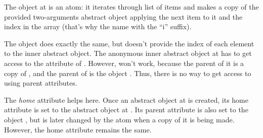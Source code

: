 The object  at  is an atom:
it iterates through list of items and makes
a copy of the provided two-arguments abstract object  applying the next
item to it and the index in the array (that's why the name with the ``i'' suffix).

The object  does exactly the same, but doesn't provide the
index of each element to the inner abstract object.
The anonymous inner abstract object at 
has to get access to the attribute  of .
However,  won't work, because the parent of it is a copy of , and the
parent of  is the object .
Thus, there is no way to get access
to  using parent attributes.

The \emph{home} attribute \ff{\&} helps here.
Once an abstract object at  is created, its
home attribute is set to the abstract object  at .
Its parent attribute \ff{\^{}} is also set to the object ,
but is later changed by the atom  when a copy of it is being made.
However, the home attribute remains the same.
